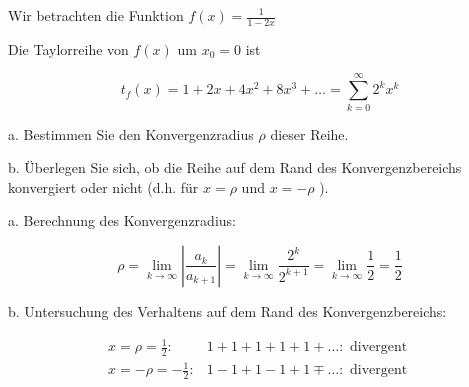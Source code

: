 \begin{example}
    Wir betrachten die Funktion
    $
    f(x)=\frac{1}{1-2 x}
    $
    
    Die Taylorreihe von $f(x)$ um $x_{0}=0$ ist
    
    $$
    t_{f}(x)=1+2 x+4 x^{2}+8 x^{3}+\ldots=\sum_{k=0}^{\infty} 2^{k} x^{k}
    $$
    
    
    a. Bestimmen Sie den Konvergenzradius $\rho$ dieser Reihe.
    
    b. Überlegen Sie sich, ob die Reihe auf dem Rand des Konvergenzbereichs konvergiert oder nicht (d.h. für $x=\rho$ und $x=-\rho$ ).

\tcblower
 a. Berechnung des Konvergenzradius:

$$
\rho=\lim _{k \rightarrow \infty}\left|\frac{a_{k}}{a_{k+1}}\right|=\lim _{k \rightarrow \infty} \frac{2^{k}}{2^{k+1}}=\lim _{k \rightarrow \infty} \frac{1}{2}=\frac{1}{2}
$$

b. Untersuchung des Verhaltens auf dem Rand des Konvergenzbereichs:

$$
\begin{array}{rr}
x=\rho=\frac{1}{2}: & 1+1+1+1+1+\ldots: \text { divergent } \\
x=-\rho=-\frac{1}{2}: & 1-1+1-1+1 \mp \ldots: \text { divergent }
\end{array}
$$
\end{example}


